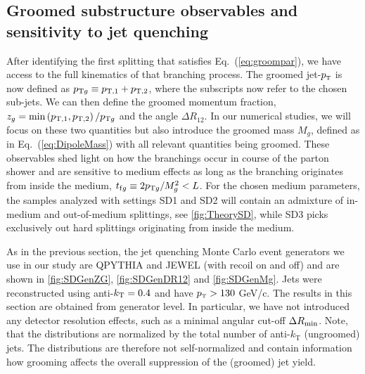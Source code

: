 \subsection{Groomed substructure observables and sensitivity to jet quenching}
\label{sec:groomedobservables}

After identifying the first splitting that satisfies Eq.~(\ref{eq:groompar}), we have access to the full kinematics of that branching process. The groomed jet-$p_{\text{\tiny T}}$ is now defined as $p_{{\rm \tiny T} g} \equiv p_{\mathrm{T},1}+p_{\mathrm{T},2}$, where the subscripts now refer to the chosen sub-jets. We can then define the groomed momentum fraction, $z_g = \min \left(p_{{\rm \tiny T},1},p_{{\rm \tiny T},2}\right)/p_{{\rm \tiny T}g}$ and the angle $\Delta R_{12}$. In our numerical studies, we will focus on these two quantities but also introduce the groomed mass $M_g$, defined as in Eq.~(\ref{eq:DipoleMass}) with all relevant quantities being groomed. These observables shed light on how the branchings occur in course of the parton shower and are sensitive to medium effects as long as the branching originates from inside the medium, $ t_{{\rm f}g}\equiv 2 p_{{\rm \tiny T}g}/M_g^2 < L$. For the chosen medium parameters, the samples analyzed with settings SD1 and SD2 will contain an admixture of in-medium and out-of-medium splittings, see \autoref{fig:TheorySD}, while SD3 picks exclusively out hard splittings originating from inside the medium. 

As in the previous section, the jet quenching Monte Carlo event generators we use in our study are QPYTHIA and JEWEL (with recoil on and off) and are shown in \autoref{fig:SDGenZG}, \ref{fig:SDGenDR12} and \ref{fig:SDGenMg}. Jets were reconstructed using anti-$k_{\rm \tiny T}=0.4$ and have $p_{\text{\tiny T}} > 130$ GeV/c. 
The results in this section are obtained from generator level. In particular, we have not introduced any detector resolution effects, such as a minimal angular cut-off $\Delta R_{\rm min}$.
Note, that the distributions are normalized by the total number of anti-$k_{\text{T}}$ (ungroomed) jets. The distributions are therefore not self-normalized and contain information how grooming affects the overall suppression of the (groomed) jet yield. 

